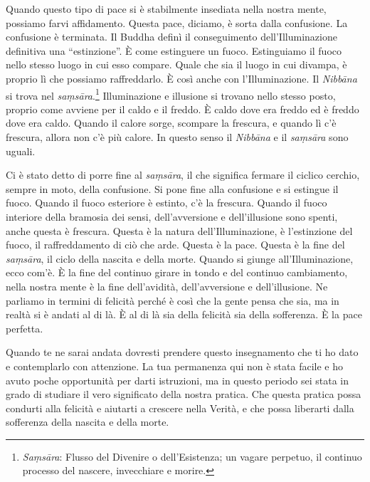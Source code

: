 Quando questo tipo di pace si è stabilmente insediata nella nostra
mente, possiamo farvi affidamento. Questa pace, diciamo, è sorta dalla
confusione. La confusione è terminata. Il Buddha definì il conseguimento
dell'Illuminazione definitiva una ``estinzione''. È come estinguere un
fuoco. Estinguiamo il fuoco nello stesso luogo in cui esso compare.
Quale che sia il luogo in cui divampa, è proprio lì che possiamo
raffreddarlo. È così anche con l'Illuminazione. Il \emph{Nibbāna} si
trova nel \emph{saṃsāra}.\footnote{\emph{Saṃsāra}: Flusso del Divenire o
  dell'Esistenza; un vagare perpetuo, il continuo processo del nascere,
  invecchiare e morire.} Illuminazione e illusione si trovano nello
stesso posto, proprio come avviene per il caldo e il freddo. È caldo
dove era freddo ed è freddo dove era caldo. Quando il calore sorge,
scompare la frescura, e quando lì c'è frescura, allora non c'è più
calore. In questo senso il \emph{Nibbāna} e il \emph{saṃsāra} sono
uguali.

Ci è stato detto di porre fine al \emph{saṃsāra}, il che significa
fermare il ciclico cerchio, sempre in moto, della confusione. Si pone
fine alla confusione e si estingue il fuoco. Quando il fuoco esteriore è
estinto, c'è la frescura. Quando il fuoco interiore della bramosia dei
sensi, dell'avversione e dell'illusione sono spenti, anche questa è
frescura. Questa è la natura dell'Illuminazione, è l'estinzione del
fuoco, il raffreddamento di ciò che arde. Questa è la pace. Questa è la
fine del \emph{saṃsāra}, il ciclo della nascita e della morte. Quando si
giunge all'Illuminazione, ecco com'è. È la fine del continuo girare in
tondo e del continuo cambiamento, nella nostra mente è la fine
dell'avidità, dell'avversione e dell'illusione. Ne parliamo in termini
di felicità perché è così che la gente pensa che sia, ma in realtà si è
andati al di là. È al di là sia della felicità sia della sofferenza. È
la pace perfetta.

Quando te ne sarai andata dovresti prendere questo insegnamento che ti
ho dato e contemplarlo con attenzione. La tua permanenza qui non è stata
facile e ho avuto poche opportunità per darti istruzioni, ma in questo
periodo sei stata in grado di studiare il vero significato della nostra
pratica. Che questa pratica possa condurti alla felicità e aiutarti a
crescere nella Verità, e che possa liberarti dalla sofferenza della
nascita e della morte.

